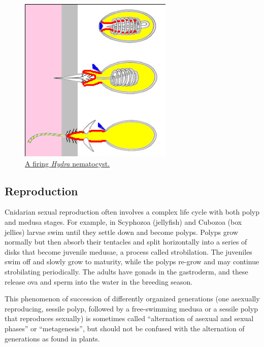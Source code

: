 \begin{figure}

{\centering \includegraphics[width=0.7\linewidth]{./figures/porifera/nematocyst}

}

\caption{\href{https://commons.wikimedia.org/wiki/File:Hydra_nematocyst_firing_01.png}{A
firing \emph{Hydra} nematocyst.}}\label{fig:nematocyst}
\end{figure}

\subsection{Reproduction}\label{reproduction-2}

Cnidarian sexual reproduction often involves a complex life cycle with
both polyp and medusa stages. For example, in Scyphozoa (jellyfish) and
Cubozoa (box jellies) larvae swim until they settle down and become
polyps. Polyps grow normally but then absorb their tentacles and split
horizontally into a series of disks that become juvenile medusae, a
process called strobilation. The juveniles swim off and slowly grow to
maturity, while the polyps re-grow and may continue strobilating
periodically. The adults have gonads in the gastroderm, and these
release ova and sperm into the water in the breeding season.

This phenomenon of succession of differently organized generations (one
asexually reproducing, sessile polyp, followed by a free-swimming medusa
or a sessile polyp that reproduces sexually) is sometimes called
``alternation of asexual and sexual phases'' or ``metagenesis'', but
should not be confused with the alternation of generations as found in
plants.

